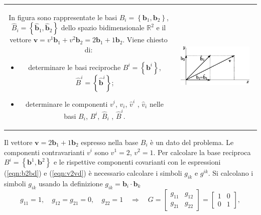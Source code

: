 \begin{tabular}{cc}
\begin{minipage}{0.60\textwidth}
\begin{example}\label{exa:basis}
In figura %
 sono rappresentate le basi $B_i=\left\{ \bm{b}_1 , \bm{b}_2 \right\}$, 
 $\hat{B}_i = \left\{ \bm{\hat{b}}_1 , \bm{\hat{b}}_2 \right\}$ dello spazio bidimensionale
 $\mathbb{R}^2$ e il vettore $\bm{v} = v^1 \bm{b}_1 + v^2 \bm{b}_2 = 2 \bm{b}_1 + 1 \bm{b}_2$.
Viene chiesto di:
\begin{itemize}
 \item determinare le basi reciproche $B^i = \left\{ \bm{b}^i \right\}$, $\hat{B}^i = \left\{ \bm{\hat{b}}^i \right\}$;
 \item determinare le componenti $v^i$, $v_i$, $\hat{v}^i$ , $\hat{v}_i$ nelle basi $B_i$, $B^i$, $\hat{B}_i$ , $\hat{B}^i$.
\end{itemize}
\end{example}
\end{minipage}
&
\begin{minipage}{0.40\textwidth}
\begin{center}%
   \includegraphics[width=0.90\textwidth]{./fig/ese_basis1.eps}
\end{center}
\end{minipage}
\end{tabular}
%
Il vettore $\bm{v} = 2\bm{b}_1 + 1 \bm{b}_2$ espresso nella base $B_i$ è un dato del problema. Le componenti contravarianti $v^i$ sono $v^1 = 2$, $v^2=1$.
%
Per calcolare la base reciproca $B^i = \left\{ \bm{b}^1 , \bm{b}^2 \right\}$ e le rispettive componenti covarianti con le espressioni (\ref{eqn:b2bd}) e (\ref{eqn:v2vd}) è necessario calcolare i simboli $g_{ik}$ e $g^{ik}$. 
Si calcolano i simboli $g_{ik}$ usando la definizione $g_{ik} = \bm{b}_i \cdot \bm{b}_k$
\begin{equation}
 g_{11} = 1 , \quad g_{12} = g_{21} = 0 , \quad g_{22} = 1
 \quad \Rightarrow \quad
 G = \begin{bmatrix} g_{11} & g_{12} \\ g_{21} & g_{22} \end{bmatrix}
   = \begin{bmatrix} 1 & 0 \\ 0 & 1 \end{bmatrix} ,
\end{equation}

